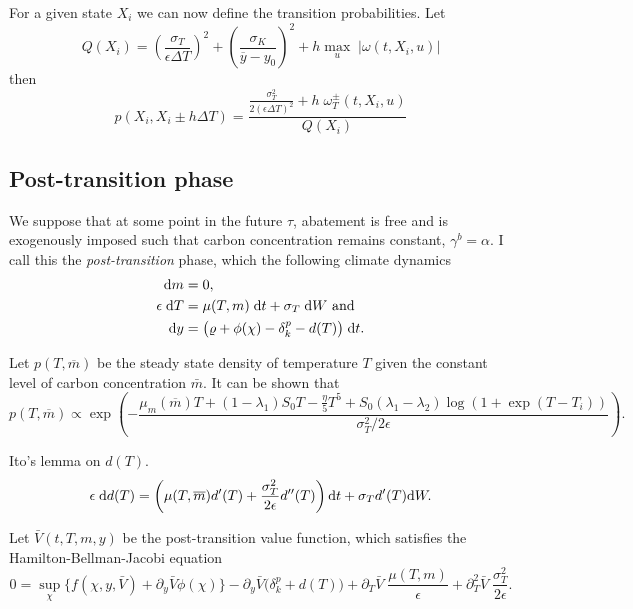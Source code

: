 \documentclass[../../main.tex]{subfiles}
\begin{document}
For a given state $X_i$ we can now define the transition probabilities. Let \begin{equation}
    Q(X_i) = \left(\frac{\sigma_T}{\epsilon \Delta T}\right)^2 + \left(\frac{\sigma_K}{\overline{y} - y_0}\right)^2 + h \max_u \; \lvert \omega(t, X_i, u)  \rvert
\end{equation} then \begin{equation}
    p(X_i, X_i \pm h \Delta T) = \frac{\frac{\sigma^2_T}{2(\epsilon \Delta T)^2} + h \; \omega^{\pm}_T(t, X_i, u)}{Q(X_i)}
\end{equation}

\subsection{Post-transition phase}

We suppose that at some point in the future $\tau$, abatement is free and is exogenously imposed such that carbon concentration remains constant, $\gamma^b = \alpha$. I call this the \textit{post-transition} phase, which the following climate dynamics \begin{align}
    \mathrm{d}m &= 0, \\
    \epsilon \; \mathrm{d}T &= \mu(T, m) \; \mathrm{d}t + \sigma_T \; \mathrm{d}W \text{ and } \\
    \mathrm{d}y &= \big( \varrho + \phi(\chi) - \delta_k^p - d(T) \big) \; \mathrm{d}t.
\end{align}

Let $p(T, \overline{m})$ be the steady state density of temperature $T$ given the constant level of carbon concentration $\bar{m}$. It can be shown that \begin{equation}
    p(T, \overline{m}) \propto \exp\left(-\frac{\mu_m(\overline{m}) T + (1 - \lambda_1) S_0 T - \frac{\eta}{5} T^5 + S_0 (\lambda_1 - \lambda_2) \log(1 + \exp(T - T_i))}{\sigma_T^2 / 2\epsilon}\right).
\end{equation}

Ito's lemma on $d(T)$.
\begin{equation}
    \epsilon \; \mathrm{d}d(T) = \left(\mu(T, \overline{m}) d'(T) + \frac{\sigma^2_T}{2\epsilon} d''(T) \right) \mathrm{d}t + \sigma_T d'(T) \mathrm{d}W.
\end{equation}

\newpage

Let $\bar{V}(t, T, m, y)$ be the post-transition value function, which satisfies the Hamilton-Bellman-Jacobi equation \begin{equation}
    0 = \sup_{\chi} \Big\{f(\chi, y, \bar{V}) +  \partial_y \bar{V} \phi(\chi) \Big\} - \partial_y \bar{V} \Big(\delta^{p}_k + d(T)\Big) + \partial_T \bar{V} \; \frac{\mu(T, m)}{\epsilon}+ \partial^2_T \bar{V} \; \frac{\sigma^2_T}{2\epsilon}.
\end{equation}
\end{document}
